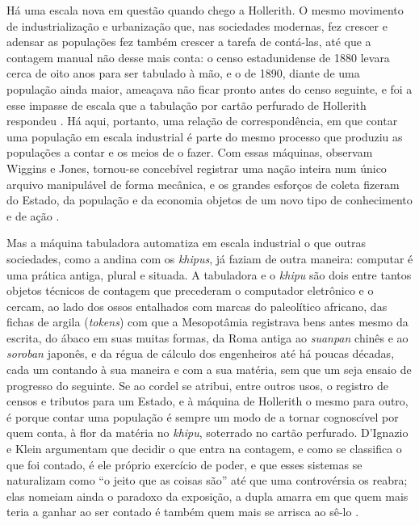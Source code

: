 Há uma escala nova em questão quando chego a Hollerith. O mesmo movimento de industrialização e urbanização que, nas sociedades modernas, fez crescer e adensar as populações fez também crescer a tarefa de contá-las, até que a contagem manual não desse mais conta: o censo estadunidense de 1880 levara cerca de oito anos para ser tabulado à mão, e o de 1890, diante de uma população ainda maior, ameaçava não ficar pronto antes do censo seguinte, e foi a esse impasse de escala que a tabulação por cartão perfurado de Hollerith respondeu \parencite{Austrian1982Hollerith}. Há aqui, portanto, uma relação de correspondência, em que contar uma população em escala industrial é parte do mesmo processo que produziu as populações a contar e os meios de o fazer. Com essas máquinas, observam Wiggins e Jones, tornou-se concebível registrar uma nação inteira num único arquivo manipulável de forma mecânica, e os grandes esforços de coleta fizeram do Estado, da população e da economia objetos de um novo tipo de conhecimento e de ação \parencite{Wiggins2023Data}.

Mas a máquina tabuladora automatiza em escala industrial o que outras sociedades, como a andina com os \textit{khipus}, já faziam de outra maneira: computar é uma prática antiga, plural e situada. A tabuladora e o \textit{khipu} são dois entre tantos objetos técnicos de contagem que precederam o computador eletrônico e o cercam, ao lado dos ossos entalhados com marcas do paleolítico africano, das fichas de argila (\emph{tokens}) com que a Mesopotâmia registrava bens antes mesmo da escrita, do ábaco em suas muitas formas, da Roma antiga ao \textit{suanpan} chinês e ao \textit{soroban} japonês, e da régua de cálculo dos engenheiros até há poucas décadas, cada um contando à sua maneira e com a sua matéria, sem que um seja ensaio de progresso do seguinte. Se ao cordel se atribui, entre outros usos, o registro de censos e tributos para um Estado, e à máquina de Hollerith o mesmo para outro, é porque contar uma população é sempre um modo de a tornar cognoscível por quem conta, à flor da matéria no \textit{khipu}, soterrado no cartão perfurado. D'Ignazio e Klein argumentam que decidir o que entra na contagem, e como se classifica o que foi contado, é ele próprio exercício de poder, e que esses sistemas se naturalizam como \enquote{o jeito que as coisas são} até que uma controvérsia os reabra; elas nomeiam ainda o paradoxo da exposição, a dupla amarra em que quem mais teria a ganhar ao ser contado é também quem mais se arrisca ao sê-lo \parencite{DIganzio2020Data}.

